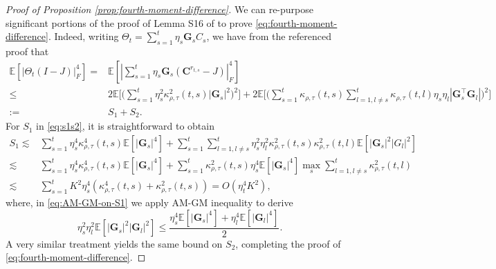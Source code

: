 \documentclass[a4paper,11pt]{article}
\numberwithin{equation}{section}
\theoremstyle{plain}
\theoremstyle{remark}
\def\IE{\mathbb{E}}
\def\bC{\mathbf{C}}
\def\bG{\mathbf{G}}
\begin{document}
\begin{proof}[Proof of Proposition \ref{prop:fourth-moment-difference}]
We can re-purpose significant portions of the proof of Lemma S16 of \cite{songxichen2024} to prove \eqref{eq:fourth-moment-difference}. Indeed, writing $\Theta_t=\sum_{s=1}^t \eta_s \bG_s C_s$, we have from the referenced proof that
\begin{align}
    \IE[|\Theta_t(I-J)|_F^4] =& \IE[|\sum_{s=1}^t\eta_s \bG_s( \bC^{r_{t,s}} - J)|_F^4] \nonumber\\
    \leq &  2\IE\bigg[\Big(\sum_{s=1}^t \eta_s^2 \kappa_{\rho, \tau}^2(t,s) |\bG_s|^2 \Big)^2\bigg] + 2\IE\bigg[\Big(\sum_{s=1}^t \kappa_{\rho, \tau}(t,s) \sum_{l=1, l\neq s}^t \kappa_{\rho, \tau}(t,l) \eta_s \eta_l |\bG_s^\top \bG_l|  \Big)^2 \bigg]\nonumber\\
    := & S_1 + S_2 .\label{eq:s1s2}
\end{align}
For $S_1$ in \eqref{eq:s1s2}, it is straightforward to obtain
\begin{align}
    S_1 \lesssim & \sum_{s=1}^t \eta_s^4 \kappa_{\rho, \tau}^4(t,s) \IE[|\bG_s|^4] + \sum_{s=1}^t \sum_{l=1, l \neq s}^t \eta_s^2\eta_l^2 \kappa_{\rho, \tau}^2(t,s)\kappa_{\rho, \tau}^2(t,l)\IE[|\bG_s|^2|G_l|^2] \nonumber\\
    \lesssim &\sum_{s=1}^t \eta_s^4 \kappa_{\rho, \tau}^4(t,s) \IE[|\bG_s|^4] + \sum_{s=1}^t \kappa_{\rho, \tau}^2(t,s) \eta_s^4 \IE[|\bG_s|^4] \max_s\sum_{l=1, l\neq s}^t \kappa_{\rho, \tau}^2(t,l) \label{eq:AM-GM-on-S1}\\
    \lesssim & \sum_{s=1}^t K^2\eta_s^4 (\kappa_{\rho, \tau}^4(t,s) + \kappa_{\rho, \tau}^2(t,s)) = O(\eta_t^4K^2) \label{eq:bound-on-S1},
\end{align}
where, in \eqref{eq:AM-GM-on-S1} we apply AM-GM inequality to derive 
\[ \eta_s^2\eta_l^2 \IE[|\bG_s|^2|\bG_l|^2] \leq \frac{\eta_s^4 \IE[|\bG_s|^4] + \eta_l^4 \IE[|\bG_l|^4]}{2} .\]
A very similar treatment yields the same bound on $S_2$, completing the proof of \eqref{eq:fourth-moment-difference}.
\end{proof}
\end{document}
